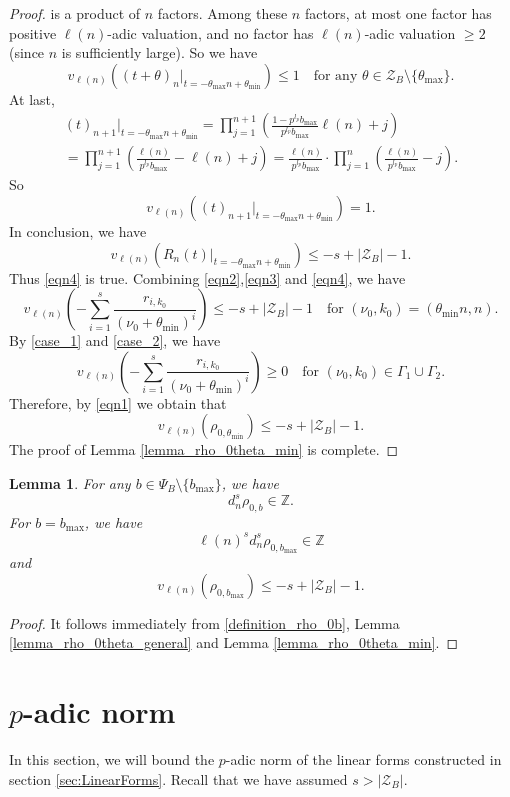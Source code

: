 \documentclass[12pt]{article}
\newtheorem{lemma}[theorem]{Lemma}
\numberwithin{equation}{section}
\begin{document}
\begin{proof}
is a product of $n$ factors. Among these $n$ factors, at most one factor has positive $\ell(n)$-adic valuation, and no factor has $\ell(n)$-adic valuation $\geqslant 2$ (since $n$ is sufficiently large). So we have
\[ v_{\ell(n)}\left( (t+\theta)_{n} \big|_{t = -\theta_{\max}n+\theta_{\min}} \right) \leqslant 1 \quad\text{for any~} \theta \in \mathcal{Z}_{B} \setminus \{ \theta_{\max}\}. \]
At last, 
\begin{multline*}
(t)_{n+1} \big|_{t = -\theta_{\max}n+\theta_{\min}} = \prod_{j=1}^{n+1} \left( \frac{1-p^{l_p}b_{\max}}{p^{l_p}b_{\max}}\ell(n)+j \right)\\=\prod_{j=1}^{n+1} \left( \frac{\ell(n)}{p^{l_p}b_{\max}}-\ell(n)+j \right)= \frac{\ell(n)}{p^{l_p}b_{\max}} \cdot \prod_{j=1}^{n} \left( \frac{\ell(n)}{p^{l_p}b_{\max}} - j \right).
\end{multline*}
So 
\[ v_{\ell(n)}\left( (t)_{n+1} \big|_{t = -\theta_{\max}n+\theta_{\min}} \right) = 1.\]
In conclusion, we have
\[ v_{\ell(n)}\left( R_n(t) \big|_{t = -\theta_{\max}n+\theta_{\min}}\right) \leqslant -s + |\mathcal{Z}_B| - 1. \]
Thus \eqref{eqn4} is true. Combining \eqref{eqn2},\eqref{eqn3} and \eqref{eqn4}, we have
\[ v_{\ell(n)} \left( -\sum_{i=1}^{s}\frac{r_{i,k_0}}{(\nu_0+\theta_{\min})^{i}} \right) \leqslant -s + |\mathcal{Z}_B| - 1 \quad\text{for~} (\nu_0,k_0) = (\theta_{\min}n,n). \]
By \eqref{case_1} and \eqref{case_2}, we have
\[ v_{\ell(n)} \left( -\sum_{i=1}^{s}\frac{r_{i,k_0}}{(\nu_0+\theta_{\min})^{i}} \right) \geqslant 0 \quad\text{for~} (\nu_0,k_0) \in \Gamma_1 \cup \Gamma_2.  \] 
Therefore, by \eqref{eqn1} we obtain that
\[ v_{\ell(n)}(\rho_{0,\theta_{\min}}) \leqslant  -s + |\mathcal{Z}_B| - 1. \]
The proof of Lemma \ref{lemma_rho_0theta_min} is complete.
\end{proof}


\begin{lemma}\label{lemma_integrality_rho_0_b}
For any $b \in \Psi_{B} \setminus \{b_{\max}\}$, we have 
\[ d_n^{s}\rho_{0,b} \in \mathbb{Z}. \]
For $b= b_{\max}$, we have
\[ \ell(n)^sd_n^s\rho_{0,b_{\max}} \in \mathbb{Z} \]
and 
\[ v_{\ell(n)}(\rho_{0,b_{\max}}) \leqslant -s+|\mathcal{Z}_B| -1. \]	
\end{lemma}

\begin{proof}
It follows immediately from \eqref{definition_rho_0b}, Lemma \ref{lemma_rho_0theta_general} and Lemma \ref{lemma_rho_0theta_min}.
\end{proof}


\section{$p$-adic norm}\label{sec:p-adic}
In this section, we will bound the $p$-adic norm of the linear forms constructed in section \ref{sec:LinearForms}. Recall that we have assumed $ s > |\mathcal{Z}_B|$. 
\end{document}
